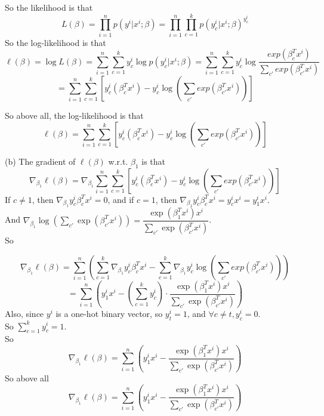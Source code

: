 \documentclass[10pt]{article}
\begin{document}
\begin{enumerate}[1.]
		  So the likelihood is that
		  $$L(\beta)=\prod\limits_{i=1}^np(y^i|x^i;\beta)=\prod\limits_{i=1}^n\prod\limits_{c=1}^k p(y_c^i|x^i;\beta)^{y_c^i}$$
		  So the log-likelihood is that
		  $$\ell(\beta)=\log L(\beta)=\sum\limits_{i=1}^n\sum\limits_{c=1}^k y_c^i\log p(y_c^i|x^i;\beta)=\sum\limits_{i=1}^n\sum\limits_{c=1}^k y_c^i\log\dfrac{exp(\beta_c^Tx^i)}{\sum\limits_{c'}exp(\beta_{c'}^Tx^i)}$$
		  $$=\sum\limits_{i=1}^n\sum\limits_{c=1}^k\left[y_c^i(\beta_c^Tx^i)-y_c^i\log(\sum\limits_{c'}exp(\beta_{c'}^Tx^i))\right]$$

		  So above all, the log-likelihood is that
		  $$\ell(\beta)=\sum\limits_{i=1}^n\sum\limits_{c=1}^k\left[y_c^i(\beta_c^Tx^i)-y_c^i\log(\sum\limits_{c'}exp(\beta_{c'}^Tx^i))\right]$$

		  (b) The gradient of $\ell(\beta)$ w.r.t. $\beta_1$ is that
		  $$\nabla_{\beta_1}\ell(\beta)=\nabla_{\beta_1}\sum\limits_{i=1}^n\sum\limits_{c=1}^k\left[y_c^i(\beta_c^Tx^i)-y_c^i\log(\sum\limits_{c'}exp(\beta_{c'}^Tx^i))\right]$$
		  If $c\neq 1$, then $\nabla_{\beta_1}y_c^i\beta_c^Tx^i=0$, and if $c=1$, then $\nabla_{\beta_1}y_c^i\beta_c^Tx^i=y_c^ix^i=y_{1}^ix^i$.\\
		  And $\nabla_{\beta_1}\log(\sum\limits_{c'}\exp(\beta_{c'}^Tx^i))=\dfrac{\exp(\beta_1^Tx^i)x^i}{\sum\limits_{c'}\exp(\beta_{c'}^Tx^i)}$.\\
		  So
		  
		  $$\nabla_{\beta_1}\ell(\beta)=\sum\limits_{i=1}^n\left(\sum\limits_{c=1}^k\nabla_{\beta_1}y_c^i\beta_c^Tx^i-\sum\limits_{c=1}^k\nabla_{\beta_1}y_c^i\log(\sum\limits_{c'}exp(\beta_{c'}^Tx^i))\right)$$
		  $$=\sum\limits_{i=1}^n\left(y_1^ix^i-(\sum\limits_{c=1}^ky_c^i)\cdot\dfrac{\exp(\beta_1^Tx^i)x^i}{\sum\limits_{c'}\exp(\beta_{c'}^Tx^i)}\right)$$
		  Also, since $y^i$ is a one-hot binary vector, so $y_t^i=1$, and $\forall c\neq t, y_{c}^i=0$.\\
		  So $\sum\limits_{c=1}^ky_c^i=1$.\\
		  So
		  $$\nabla_{\beta_1}\ell(\beta)=\sum\limits_{i=1}^n\left(y_1^ix^i-\dfrac{\exp(\beta_1^Tx^i)x^i}{\sum\limits_{c'}\exp(\beta_{c'}^Tx^i)}\right)$$
		  So above all
		  $$\nabla_{\beta_1}\ell(\beta)=\sum\limits_{i=1}^n\left(y_1^ix^i-\dfrac{\exp(\beta_1^Tx^i)x^i}{\sum\limits_{c'}\exp(\beta_{c'}^Tx^i)}\right)$$

	      \newpage


\end{enumerate}
\end{document}
